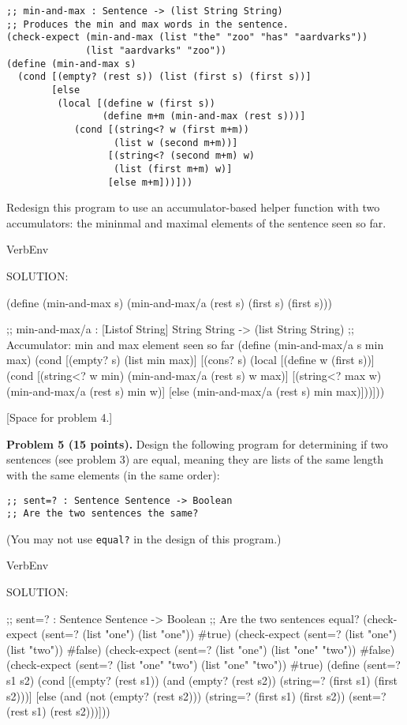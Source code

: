 \documentclass[12pt]{article}
\begin{document}
\begin{verbatim}
;; min-and-max : Sentence -> (list String String)
;; Produces the min and max words in the sentence.
(check-expect (min-and-max (list "the" "zoo" "has" "aardvarks"))
              (list "aardvarks" "zoo"))
(define (min-and-max s)
  (cond [(empty? (rest s)) (list (first s) (first s))]
        [else
         (local [(define w (first s))
                 (define m+m (min-and-max (rest s)))]
            (cond [(string<? w (first m+m))
                   (list w (second m+m))]
                  [(string<? (second m+m) w)
                   (list (first m+m) w)]
                  [else m+m]))]))
\end{verbatim}
Redesign this program to use an accumulator-based helper function with
two accumulators: the mininmal and maximal elements of the sentence
seen so far.


\begin{SaveVerbatim}{VerbEnv}


SOLUTION:

(define (min-and-max s)
  (min-and-max/a (rest s) (first s) (first s)))

;; min-and-max/a : [Listof String] String String -> (list String String)
;; Accumulator: min and max element seen so far
(define (min-and-max/a s min max)
  (cond [(empty? s) (list min max)]
        [(cons? s)
         (local [(define w (first s))]
           (cond [(string<? w min) 
                  (min-and-max/a (rest s) w max)]
                 [(string<? max w)
                  (min-and-max/a (rest s) min w)]
                 [else
                  (min-and-max/a (rest s) min max)]))]))
\end{SaveVerbatim}



\newpage

[Space for problem 4.]


\newpage 
\noindent
{\bf Problem 5 (15 points).}
%
Design the following program for determining if two sentences (see problem 3) are equal,
meaning they are lists of the same length with the same elements (in the same order):
\begin{verbatim}
;; sent=? : Sentence Sentence -> Boolean
;; Are the two sentences the same?
\end{verbatim}
(You may not use {\tt equal?} in the design of this program.)


\begin{SaveVerbatim}{VerbEnv}


SOLUTION:

;; sent=? : Sentence Sentence -> Boolean
;; Are the two sentences equal?
(check-expect (sent=? (list "one") (list "one")) #true)
(check-expect (sent=? (list "one") (list "two")) #false)
(check-expect (sent=? (list "one") (list "one" "two")) #false)
(check-expect (sent=? (list "one" "two") (list "one" "two")) #true)
(define (sent=? s1 s2)
  (cond [(empty? (rest s1))
         (and (empty? (rest s2))
              (string=? (first s1) (first s2)))]
        [else
         (and (not (empty? (rest s2)))
              (string=? (first s1) (first s2))
              (sent=? (rest s1) (rest s2)))]))
\end{SaveVerbatim}
\end{document}
